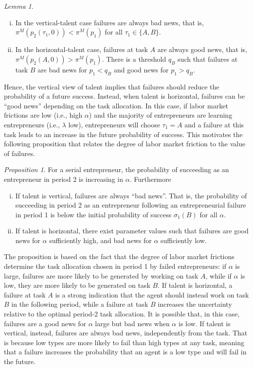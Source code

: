 \documentclass[12pt,american]{paper}
\theoremstyle{remark}
\newtheorem{prop}{Proposition}
\newtheorem{lemma}{Lemma}
\begin{document}
%
\begin{lemma}\label{lem: learning value of failures}
\begin{enumerate}[(i)]\setlength\itemsep{0em}
\item In the vertical-talent case failures are always bad news, that is,  $\pi^M(p_2(\tau_1,0))<\pi^M(p_1)$ for all $\tau_1\in \{A,B\}$.
\item In the horizontal-talent case, failures at task $A$ are always good news, that is, $\pi^M(p_2(A,0))>\pi^M(p_1)$. There is a threshold $q_B$ such that failures at task $B$ are bad news for $p_1<q_B$ and good news for $p_1>q_B$.
\end{enumerate}
\end{lemma}
%
Hence, the vertical view of talent implies that failures should reduce the probability of a future success. Instead, when talent is horizontal, failures can be ``good news'' depending on the task allocation. In this case, if labor market frictions are low (i.e., high $\alpha$) and the majority of entrepreneurs are learning entrepreneurs (i.e., $\lambda$ low), entrepreneurs will choose $\tau_1=A$ and a failure at this task leads to an increase in the future probability of success. This motivates the following proposition that relates the degree of labor market friction to the value of failures.
%
\begin{prop}
	\label{prop:probability-of-success} For a serial entrepreneur, the probability of succeeding as an entrepreneur in period 2 is increasing in $\alpha$. Furthermore
 \begin{enumerate}[(i)]\setlength\itemsep{0em}
\item If talent is vertical, failures are always ``bad news''. That is, the probability of succeeding in period 2 as an entrepreneur following an entrepreneurial failure in period 1 is below the initial probability of success $\sigma_1 (B)$ for all $\alpha$. 
\item If talent is horizontal, there exist parameter values such that failures are good news for $\alpha$ sufficiently high, and bad news for $\alpha$ sufficiently low.
\end{enumerate}
\end{prop}
%
The proposition is based on the fact that the degree of labor market frictions determine the task allocation chosen in period 1 by failed entrepreneurs: if $\alpha$ is large, failures are more likely to be generated by working on task $A$, while if $\alpha$ is low, they are more likely to be generated on task $B$. If talent is horizontal, a failure at task $A$ is a strong indication that the agent should instead work on task $B$ in the following period, while a failure at task $B$ increases the uncertainty relative to the optimal period-2 task allocation. It is possible that, in this case, failures are a good news for $\alpha$ large but bad news when $\alpha$ is low. If talent is vertical, instead, failures are always bad news, independently from the task. That is because low types are more likely to fail than high types at any task, meaning that a failure increases the probability that an agent is a low type and will fail in the future.
\end{document}
